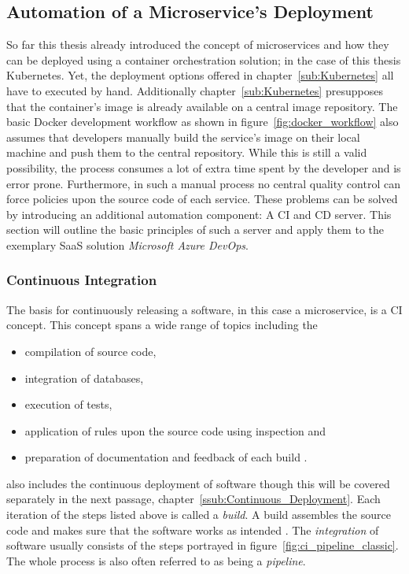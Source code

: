 
\subsection{Automation of a Microservice's Deployment}%
\label{sub:Automatic_a_Microservices_Deployment}
So far this thesis already introduced the concept of microservices and how they
can be deployed using a container orchestration solution; in the case of this
thesis Kubernetes. Yet, the deployment options offered in
chapter~\ref{sub:Kubernetes} all have to executed by hand. Additionally
chapter~\ref{sub:Kubernetes} presupposes that the container's image is already
available on a central image repository. The basic Docker development workflow
as shown in figure~\ref{fig:docker_workflow} also assumes that developers
manually build the service's image on their local machine and push them to the
central repository. While this is still a valid possibility, the process
consumes a lot of extra time spent by the developer and is error prone.
Furthermore, in such a manual process no central quality control can force
policies upon the source code of each service. These problems can be solved by
introducing an additional automation component: A \acf{CI} and \acf{CD} server.
This section will outline the basic principles of such a server and apply them
to the exemplary \ac{SaaS} solution \textit{Microsoft Azure DevOps}.

\subsubsection{Continuous Integration}%
\label{ssub:Continuous_Integration}
The basis for continuously releasing a software, in this case a microservice,
is a \ac{CI} concept. This concept spans a wide range of topics including the
\begin{itemize}
  \item compilation of source code,
  \item integration of databases,
  \item execution of tests,
  \item application of rules upon the source code using inspection and
  \item preparation of documentation and feedback of each build \autocite[pp.
    12-20]{MatyasContinuousIntegration2007}.
\end{itemize}

\autocite{MatyasContinuousIntegration2007} also includes the continuous
deployment of software though this will be covered separately in the next
passage, chapter~\ref{ssub:Continuous_Deployment}. Each iteration of the steps
listed above is called a \textit{build}. A build assembles the source code and
makes sure that the software works as intended \autocite[p.
4]{MatyasContinuousIntegration2007}. The \textit{integration} of software
usually consists of the steps portrayed in
figure~\ref{fig:ci_pipeline_classic}. The whole process is also often referred
to as being a \textit{pipeline}.

